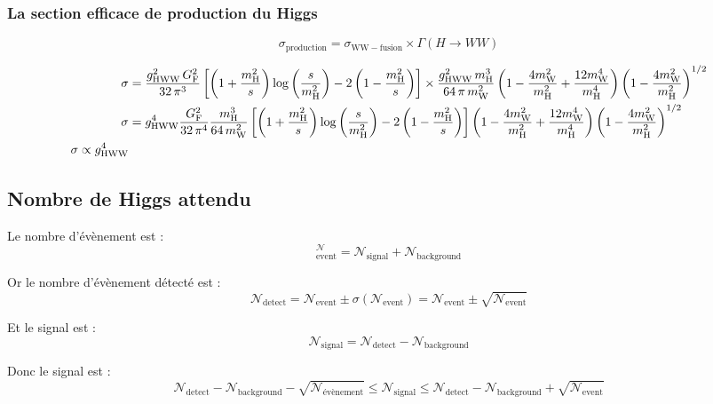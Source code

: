 \subsubsection{La section efficace de production du Higgs}

\begin{equation}
	\sigma_\mathrm{production} = \sigma_\mathrm{WW-fusion} \times \Gamma\left(H\longrightarrow WW\right)
\end{equation}

\begin{align*}
	\sigma 
		&= \frac{g_\mathrm{HWW}^2 \, G_\mathrm{F}^2}{32 \, \pi^3}
		\left[
			\left(1 + \frac{m_\mathrm{H}^2}{s}\right) \log\left(\frac{s}{m_\mathrm{H}^2}\right)
			- 2 \left(1 - \frac{m_\mathrm{H}^2}{s}\right)
		\right]
		\times 
		\frac{g_\mathrm{HWW}^2 \, m_\mathrm{H}^3}{64 \, \pi \, m_\mathrm{W}^2}
		\left(1 - \frac{4 m_\mathrm{W}^2}{m_\mathrm{H}^2} + \frac{12 m_\mathrm{W}^4}{m_\mathrm{H}^4}\right)
		\left(1 - \frac{4 m_\mathrm{W}^2}{m_\mathrm{H}^2}\right)^{1/2} \\
	\sigma &= g_\mathrm{HWW}^4 \frac{G_\mathrm{F}^2}{32 \, \pi^4} \frac{m_\mathrm{H}^3}{64 \, m_\mathrm{W}^2}
		\left[
			\left(1 + \frac{m_\mathrm{H}^2}{s}\right) \log\left(\frac{s}{m_\mathrm{H}^2}\right)
			- 2 \left(1 - \frac{m_\mathrm{H}^2}{s}\right)
		\right]
		\left(1 - \frac{4 m_\mathrm{W}^2}{m_\mathrm{H}^2} + \frac{12 m_\mathrm{W}^4}{m_\mathrm{H}^4}\right)
		\left(1 - \frac{4 m_\mathrm{W}^2}{m_\mathrm{H}^2}\right)^{1/2} \\
	\sigma \propto g_\mathrm{HWW}^4
\end{align*}


\subsection{Nombre de Higgs attendu}

Le nombre d'évènement est :
\begin{equation}
^	\mathcal{N}_\mathrm{event} 
	= \mathcal{N}_\mathrm{signal} 
	+ \mathcal{N}_\mathrm{background}
\end{equation}

Or le nombre d'évènement détecté est :
\begin{equation}
	\mathcal{N}_\mathrm{detect} 
	= \mathcal{N}_\mathrm{event} \pm \sigma(\mathcal{N}_\mathrm{event})
	= \mathcal{N}_\mathrm{event} \pm \sqrt{\mathcal{N}_\mathrm{event}}
\end{equation}

Et le signal est :
\begin{equation}
	\mathcal{N}_\mathrm{signal} 
	= \mathcal{N}_\mathrm{detect} 
	- \mathcal{N}_\mathrm{background}
\end{equation}

Donc le signal est :
\begin{equation}
	\mathcal{N}_\mathrm{detect} 
	- \mathcal{N}_\mathrm{background} 
	- \sqrt{\mathcal{N}_\mathrm{évènement}}
	\leq \mathcal{N}_\mathrm{signal} \leq
	\mathcal{N}_\mathrm{detect} 
	- \mathcal{N}_\mathrm{background} 
	+ \sqrt{\mathcal{N}_\mathrm{event}}
\end{equation}
